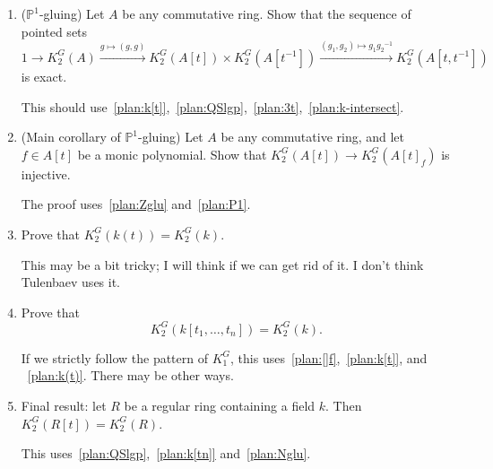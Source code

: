 \documentclass[oneside,12pt]{amsart}
\numberwithin{equation}{section}
\numberwithin{lem}{section}
\theoremstyle{definition}
\theoremstyle{remark}
\DeclareMathOperator{\St}{St^G}
\newcommand{\Pro}{\mathbb {P}}
\newcommand{\st}{\scriptstyle}
\begin{document}
\begin{enumerate}
(i) If $Ah+B=A$, i.e. the natural map $B\to A/Ah$ is surjective, then for any $x\in \St(A_h)$ there exist
$y\in \St(A)$ and $z\in \St(B_h)$ such that
$x=F_h(y)z$.

(ii) If moreover $Ah\cap B=Bh$, i.e. $B/Bh\to A/Ah$ is an isomorphism, and $h$ is not a zero divisor in $A$, then
the sequence of pointed sets
$$
K_2^G(B)\xrightarrow{\st g\mapsto (F_h(g),g)} K_2^G(B_h)\times K_2^G(A)\xrightarrow{\st (g_1,g_2)\mapsto g_1F_h(g_2)^{-1}}
K_2^G(A_h)
$$
is exact.

This should use something from the proof of~\eqref{plan:QSlgp} or~\eqref{plan:Zglu}; see~\cite[Lemma 3.4]{St-poly}.

\item\label{plan:P1} ($\Pro^1$-gluing) Let $A$ be any commutative ring. Show that the sequence of pointed sets
$$
1\longrightarrow K_2^G(A)\xrightarrow{\st g\mapsto (g,g)} K_2^G(A[t])\times K_2^G(A[t^{-1}])
\xrightarrow{\st (g_1,g_2)\mapsto g_1{g_2}^{-1}} K_2^G(A[t,t^{-1}])
$$
is exact.

This should use~\eqref{plan:k[t]},~\eqref{plan:QSlgp},~\eqref{plan:3t},~\eqref{plan:k-intersect}.

\item\label{plan:[]f} (Main corollary of $\Pro^1$-gluing) Let $A$ be any commutative ring, and let $f\in A[t]$ be a monic polynomial. Show that
$K_2^G(A[t])\to K_2^G(A[t]_f)$ is injective.

The proof uses~\eqref{plan:Zglu} and~\eqref{plan:P1}.

\item\label{plan:k(t)} Prove that $K_2^G(k(t))=K_2^G(k)$.

This may be a bit tricky; I will think if we can get rid of it. I don't think Tulenbaev uses it.

\item\label{plan:k[tn]} Prove that
$$K_2^G(k[t_1,\ldots,t_n])=K_2^G(k).$$

If we strictly follow the pattern of $K_1^G$, this uses~\eqref{plan:[]f},~\eqref{plan:k[t]}, and
~\eqref{plan:k(t)}. There may be other ways.

\item \label{plan:final} Final result: let $R$ be a regular ring containing a field $k$. Then $K_2^G(R[t])=K_2^G(R)$.

This uses~\eqref{plan:QSlgp},~\eqref{plan:k[tn]} and~\eqref{plan:Nglu}.
\end{enumerate}

\end{document}
